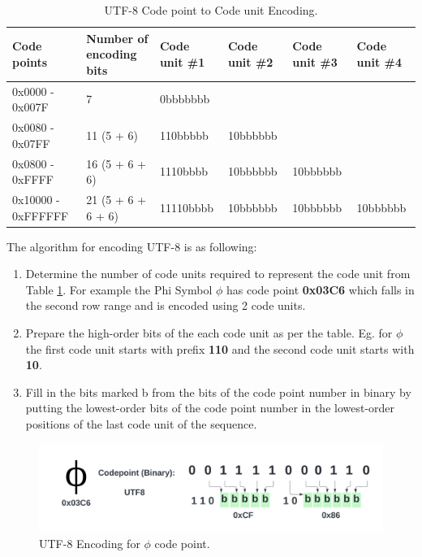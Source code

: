 {\renewcommand{\arraystretch}{1.5}%
\begin{table}[ht]
\centering
\begin{adjustbox}{width=1.1\textwidth,center=\textwidth}
\small
\begin{tabular}{|l|l|l|l|l|l|}
\hline
Code points        & Number of encoding bits & Code unit \#1 & Code unit \#2 & Code unit \#3 & Code unit \#4  \\
\hline
0x0000 - 0x007F & 7              & 0bbbbbbb &          &          &   \\
\hline
0x0080 - 0x07FF & 11 (5 + 6)     & 110bbbbb & 10bbbbbb &          &   \\
\hline
0x0800 - 0xFFFF & 16 (5 + 6 + 6) & 1110bbbb & 10bbbbbb & 10bbbbbb &   \\
\hline
0x10000 - 0xFFFFFF & 21 (5 + 6 + 6 + 6)      & 11110bbbb     & 10bbbbbb      & 10bbbbbb      & 10bbbbbb \\
\hline
\end{tabular}
\end{adjustbox}
\caption[UTF-8 Code Points Conversion]{UTF-8 Code point to Code unit Encoding.}\label{tab:utf8}
\end{table}}
The algorithm  for encoding UTF-8 \cite{utf8RFC} is as following:
\begin{enumerate}
    \item Determine the number of code units required to represent the code unit from Table \ref{tab:utf8}. For example the Phi Symbol $\phi$ has code point \textbf{0x03C6} which falls in the second row range and is encoded using 2 code units.
    
    \item Prepare the high-order bits of the each code unit as per the table. Eg. for $\phi$ the first code unit starts with prefix \textbf{110} and the second code unit starts with \textbf{10}.
    
    \item Fill in the bits marked b from the bits of the code point number in binary by putting the lowest-order bits of
       the code point number in the lowest-order positions of the last
       code unit of the sequence.
\end{enumerate}

\begin{figure}[ht]
\includegraphics[trim=2cm 2cm 2cm 2cm,clip=true, width=\textwidth]{imgs/utf8-conv.png}
\caption[UTF8 Encoding]{UTF-8 Encoding for $\phi$ code point.}\label{fig:utf8-conv}
\end{figure}

